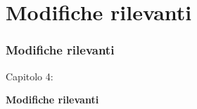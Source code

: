 %

\section{Modifiche rilevanti}
\begin{frame}[fragile]
	\frametitle{Modifiche rilevanti}

	\begin{center}\huge{Capitolo 4:}\end{center}
	\begin{center}\huge{\color{typo3darkgrey}\textbf{Modifiche rilevanti}}\end{center}

\end{frame}



